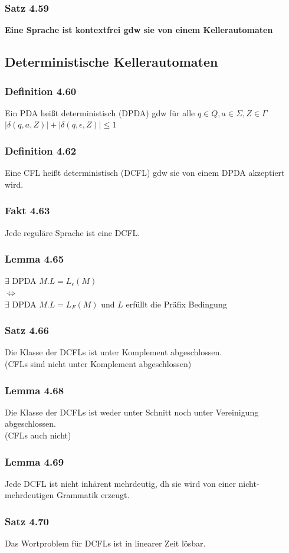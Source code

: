 \documentclass[11pt]{article}
\begin{document}
\subsubsection{Satz 4.59}
\label{sec:org6d81a07}
\textbf{Eine Sprache ist kontextfrei gdw sie von einem Kellerautomaten}

\subsection{Deterministische Kellerautomaten}
\label{sec:org97707f3}
\subsubsection{Definition 4.60}
\label{sec:org1551653}
Ein PDA heißt deterministisch (DPDA) gdw für alle \(q \in Q, a \in \Sigma, Z \in \Gamma\) \\
\(|\delta(q, a, Z)| + |\delta(q, \epsilon, Z)| \leq 1\)
\subsubsection{Definition 4.62}
\label{sec:org9dd3d70}
Eine CFL heißt deterministisch (DCFL) gdw sie von einem DPDA
akzeptiert wird.
\subsubsection{Fakt 4.63}
\label{sec:org77bd031}
Jede reguläre Sprache ist eine DCFL.
\subsubsection{Lemma 4.65}
\label{sec:org9f93e3f}
\(\exists\) DPDA \(M. L = L_\epsilon(M)\) \\
\(\iff\) \\
\(\exists\) DPDA \(M. L = L_F(M)\) und \(L\) erfüllt die Präfix Bedingung
\subsubsection{Satz 4.66}
\label{sec:org313e139}
Die Klasse der DCFLs ist unter Komplement abgeschlossen. \\
(CFLs sind nicht unter Komplement abgeschlossen)
\subsubsection{Lemma 4.68}
\label{sec:org9320864}
Die Klasse der DCFLs ist weder unter Schnitt noch unter
Vereinigung abgeschlossen. \\
(CFLs auch nicht)
\subsubsection{Lemma 4.69}
\label{sec:org244118b}
Jede DCFL ist nicht inhärent mehrdeutig, dh sie wird von einer
nicht-mehrdeutigen Grammatik erzeugt.
\subsubsection{Satz 4.70}
\label{sec:org76d8fed}
Das Wortproblem für DCFLs ist in linearer Zeit lösbar.
\end{document}
